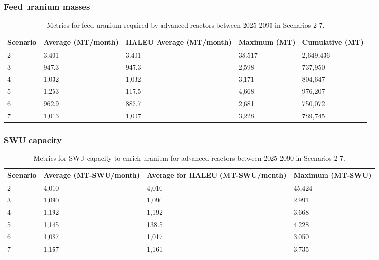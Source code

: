 \begin{frame}
    \frametitle{Feed uranium masses}
    \begin{table}
        \centering 
        \caption{Metrics for feed uranium required by advanced reactors 
        between 2025-2090 in Scenarios 2-7.}
        \label{tab:nogrowth_feed}
        \begin{tabular}{l p{2cm} p{2cm} p{2cm} p{2cm}}
            \hline
            Scenario & Average (MT/month) & \gls{HALEU} Average 
            (MT/month) & Maximum (MT) & Cumulative (MT)\\\hline
            2 & 3,401 & 3,401 & 38,517 & 2,649,436\\
            3 & 947.3 & 947.3 & 2,598 & 737,950\\
            4 & 1,032 & 1,032 & 3,171 & 804,647\\
            5 & 1,253 & 117.5 & 4,668 & 976,207\\
            6 & 962.9 & 883.7 & 2,681 & 750,072\\
            7 & 1,013 & 1,007 & 3,228 & 789,745\\
            \hline
        \end{tabular}
    \end{table}
\end{frame}

\begin{frame}
    \frametitle{SWU capacity}
    \begin{table}
        \centering 
        \caption{Metrics for \gls{SWU} capacity to enrich uranium for 
        advanced reactors between 2025-2090 in Scenarios 2-7.}
        \label{tab:nogrowth_swu}
        \begin{tabular}{l p{2cm} p{2cm} p{2cm}}
            \hline
            Scenario & Average  (MT-SWU/month) & Average
            for \gls{HALEU} (MT-SWU/month) & Maximum (MT-SWU)\\\hline
            2 & 4,010 & 4,010 & 45,424 \\
            3 & 1,090 & 1,090 & 2,991\\
            4 & 1,192 & 1,192 & 3,668\\
            5 & 1,145 & 138.5 & 4,228 \\
            6 & 1,087 & 1,017 & 3,050\\
            7 & 1,167 & 1,161 & 3,735\\
            \hline
        \end{tabular}
    \end{table}
\end{frame}

